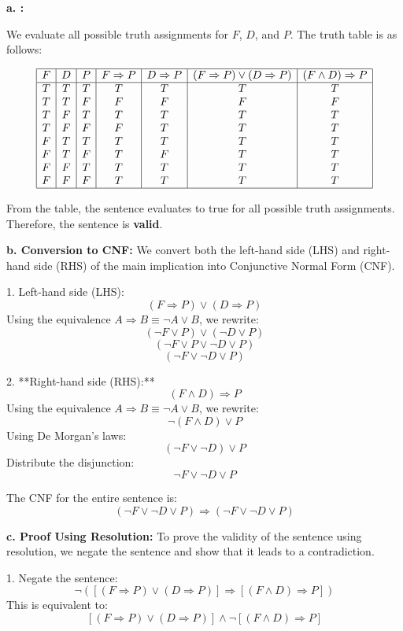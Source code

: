 \documentclass[cn,12pt]{homework}
\begin{document}
\begin{solution}
  \quad
\textbf{a. :}  

We evaluate all possible truth assignments for \(F\), \(D\), and \(P\). The truth table is as follows:

\[
\begin{array}{|c|c|c|c|c|c|c|}
\hline
F & D & P & F \Rightarrow P & D \Rightarrow P & (F \Rightarrow P) \lor (D \Rightarrow P) & (F \land D) \Rightarrow P \\
\hline
T & T & T & T & T & T & T \\
T & T & F & F & F & F & F \\
T & F & T & T & T & T & T \\
T & F & F & F & T & T & T \\
F & T & T & T & T & T & T \\
F & T & F & T & F & T & T \\
F & F & T & T & T & T & T \\
F & F & F & T & T & T & T \\
\hline
\end{array}
\]

From the table, the sentence evaluates to true for all possible truth assignments. Therefore, the sentence is \textbf{valid}.

\textbf{b. Conversion to CNF:}  
We convert both the left-hand side (LHS) and right-hand side (RHS) of the main implication into Conjunctive Normal Form (CNF).

1. Left-hand side (LHS): 
\[
(F \Rightarrow P) \lor (D \Rightarrow P)
\]
Using the equivalence \(A \Rightarrow B \equiv \neg A \lor B\), we rewrite:
\[
(\neg F \lor P) \lor (\neg D \lor P)
\]
\[
(\neg F \lor P \lor \neg D \lor P)
\]
\[
(\neg F \lor \neg D \lor P)
\]




2. **Right-hand side (RHS):**  
\[
(F \land D) \Rightarrow P
\]
Using the equivalence \(A \Rightarrow B \equiv \neg A \lor B\), we rewrite:
\[
\neg (F \land D) \lor P
\]
Using De Morgan's laws:
\[
(\neg F \lor \neg D) \lor P
\]
Distribute the disjunction:
\[
\neg F \lor \neg D \lor P
\]

The CNF for the entire sentence is:
\[
(\neg F \lor \neg D \lor P) \Rightarrow (\neg F \lor \neg D \lor P)
\]

\textbf{c. Proof Using Resolution:}  
To prove the validity of the sentence using resolution, we negate the sentence and show that it leads to a contradiction.

1. Negate the sentence:
\[
\neg \left( \left[ (F \Rightarrow P) \lor (D \Rightarrow P) \right] \Rightarrow \left[ (F \land D) \Rightarrow P \right] \right)
\]
This is equivalent to:
\[
\left[ (F \Rightarrow P) \lor (D \Rightarrow P) \right] \land \neg \left[ (F \land D) \Rightarrow P \right]
\]


\end{solution}
\end{document}
